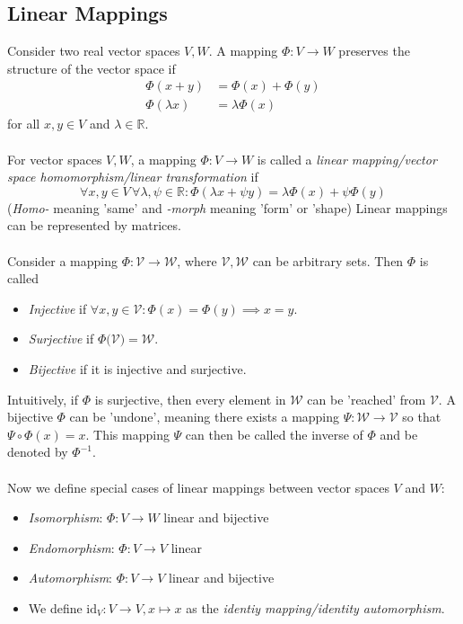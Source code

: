 \documentclass{report}
\begin{document}
\subsection{Linear Mappings} %
\label{fundamentals:linear mappings}
Consider two real vector spaces $V,W$. A mapping $\Phi:V\rightarrow W$ preserves
the structure of the vector space if
\begin{align*}
\Phi(x+y)&=\Phi(x)+\Phi(y)\\
\Phi(\lambda x)&=\lambda\Phi(x)
\end{align*}
for all $x,y\in V$ and $\lambda\in\mathbb{R}$.\\
\vspace{1mm}\\
For vector spaces $V,W$, a mapping $\Phi:V\rightarrow W$ is called a 
\textit{linear mapping/vector space homomorphism/linear transformation} if
\begin{equation*}
\forall x,y\in V\,\forall\lambda,\psi\in\mathbb{R}:\Phi(\lambda x+\psi y)
=\lambda\Phi(x)+\psi\Phi(y)
\end{equation*}
(\textit{Homo-} meaning 'same' and \textit{-morph} meaning 'form' or 'shape) 
Linear mappings can be represented by matrices.\\
\vspace{1mm}\\
Consider a mapping $\Phi:\mathcal{V\rightarrow W}$, where $\mathcal{V,W}$ can be arbitrary sets.
Then $\Phi$ is called
\begin{itemize}
\item\textit{Injective} if $\forall x,y\in\mathcal{V}:
\Phi(x)=\Phi(y)\implies x=y$.
\item\textit{Surjective} if $\Phi(\mathcal{V)=W}$.
\item\textit{Bijective} if it is injective and surjective.
\end{itemize}
Intuitively, if $\Phi$ is surjective, then every element in $\mathcal{W}$ can be 
'reached' from $\mathcal{V}$. A bijective $\Phi$ can be 'undone', 
meaning there exists a mapping $\Psi:\mathcal{W\to V}$ so that $\Psi\circ\Phi(x)=x$. 
This mapping $\Psi$ can then be called the inverse of $\Phi$ and be denoted by $\Phi^{-1}$.\\
\vspace{1mm}\\
Now we define special cases of linear mappings between vector spaces $V$ and $W$:
\begin{itemize}
\item\textit{Isomorphism}: $\Phi:V\to W$ linear and bijective
\item\textit{Endomorphism}: $\Phi:V\to V$ linear
\item\textit{Automorphism}: $\Phi:V\to V$ linear and bijective
\item We define $\text{id}_V:V\to V,x\mapsto x$ as the \textit{identiy mapping/identity automorphism}.
\end{itemize}
\end{document}
